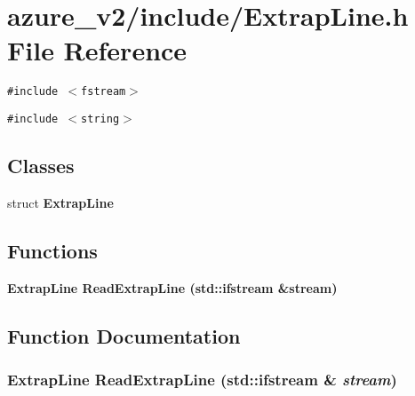 \section{azure\_\-v2/include/Extrap\-Line.h File Reference}
\label{ExtrapLine_8h}
{\tt \#include $<$fstream$>$}\par
{\tt \#include $<$string$>$}\par
\subsection*{Classes}
\begin{CompactItemize}
\item 
struct \bf{Extrap\-Line}
\end{CompactItemize}
\subsection*{Functions}
\begin{CompactItemize}
\item 
\bf{Extrap\-Line} \bf{Read\-Extrap\-Line} (std::ifstream \&stream)
\end{CompactItemize}


\subsection{Function Documentation}
\subsubsection{\setlength{\rightskip}{0pt plus 5cm}\bf{Extrap\-Line} Read\-Extrap\-Line (std::ifstream \& {\em stream})}\label{ExtrapLine_8h_d15248dd25a655afc3de2dd832a91be1}


